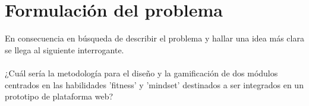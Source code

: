 \section{Formulación del problema}
En consecuencia en búsqueda de describir el problema  y hallar una idea más clara se llega al siguiente interrogante.
\\ \\
¿Cuál sería la metodología para el diseño y la gamificación de dos módulos centrados en las habilidades 'fitness' y 'mindset' destinados a ser integrados en un prototipo de plataforma web?